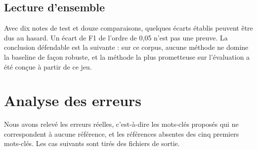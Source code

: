 \documentclass[11pt,a4paper]{article}
\begin{document}
\subsection{Lecture d'ensemble}

Avec dix notes de test et douze comparaisons, quelques écarts établis peuvent être dus au hasard. Un écart de F1 de l'ordre de 0,05 n'est pas une preuve. La conclusion défendable est la suivante : sur ce corpus, aucune méthode ne domine la baseline de façon robuste, et la méthode la plus prometteuse sur l'évaluation a été conçue à partir de ce jeu.

\section{Analyse des erreurs}

Nous avons relevé les erreurs réelles, c'est-à-dire les mots-clés proposés qui ne correspondent à aucune référence, et les références absentes des cinq premiers mots-clés. Les cas suivants sont tirés des fichiers de sortie.
\end{document}
